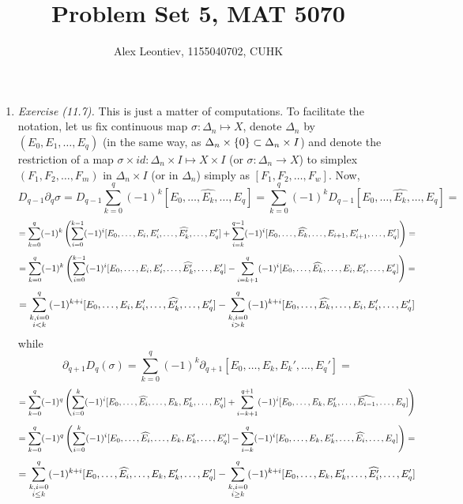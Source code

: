 \documentclass[8pt]{article} %
\title{Problem Set 5, MAT 5070}
\author{Alex Leontiev, 1155040702, CUHK}
\begin{document}
\maketitle
\begin{enumerate}[label=\bfseries \arabic*.]
	\item{{\it Exercise (11.7).} This is just a matter of computations. To facilitate the notation, let us fix continuous
		map $\sigma:\Delta_n\mapsto X$,
		denote $\Delta_n$ by $(E_0,E_1,\dots,E_q)$ (in the same way, as $\Delta_n\times\left\{0\right\}\subset\Delta_n\times I$) and denote
		the restriction of a map $\sigma\times id:\Delta_n\times I\mapsto X\times I$ (or $\sigma:\Delta_n\to X$) to simplex
		$(F_1,F_2,\dots,F_m)$ in $\Delta_n\times I$ (or in $\Delta_n$) simply as $[F_1,F_2,\dots,F_w]$. Now,
		\[D_{q-1}\partial_q\sigma=D_{q-1}\sum_{k=0}^q(-1)^k[E_0,\hdots,\widehat{E_k},\hdots,E_q]=\sum_{k=0}^q(-1)^kD_{q-1}
		[E_0,\hdots,\widehat{E_k},\hdots,E_q]=\]
		\[=\sum_{k=0}^q(-1)^k\mybra{\sum_{i=0}^{k-1}(-1)^i[E_0,\dots,E_i,E_i',\dots,\widehat{E_{k}'},\dots,E_q']+
		\sum_{i=k}^{q-1}(-1)^i [E_0,\dots,\widehat{E_{k}},\dots,E_{i+1},E_{i+1}',\dots,E_q']}=\]
		\[=\sum_{k=0}^q(-1)^k\mybra{\sum_{i=0}^{k-1}(-1)^i[E_0,\dots,E_i,E_i',\dots,\widehat{E_{k}'},\dots,E_q']-
		\sum_{i=k+1}^{q}(-1)^i [E_0,\dots,\widehat{E_{k}},\dots,E_{i},E_{i}',\dots,E_q']}=\]
		\[=\sum_{\begin{subarray}{c}k,i=0\\i< k\end{subarray}}^q(-1)^{k+i}[E_0,\dots,E_i,E_i',\dots,\widehat{E_{k}'},\dots,E_q']-
		\sum_{\begin{subarray}{c}k,i=0\\i>k\end{subarray}}^q(-1)^{k+i}[E_0,\dots,\widehat{E_{k}},\dots,E_{i},E_{i}',\dots,E_q']\]
		while \[\partial_{q+1}D_q(\sigma)=\sum_{k=0}^q(-1)^k\partial_{q+1}[E_0,\dots,E_k,E_k',\dots,E_q']=\]
		\[=\sum_{k=0}^q(-1)^q\mybra{\sum_{i=0}^k(-1)^i[E_0,\dots,\widehat{E_i},\dots,E_k,E_k',\dots,E_q']+\sum_{i=k+1}^{q+1}
		(-1)^i[E_0,\dots,E_k,E_k',\dots,\widehat{E_{i-1}},\dots,E_q]}\]
		\[=\sum_{k=0}^q(-1)^q\mybra{\sum_{i=0}^k(-1)^i[E_0,\dots,\widehat{E_i},\dots,E_k,E_k',\dots,E_q']-\sum_{i=k}^{q}
		(-1)^i[E_0,\dots,E_k,E_k',\dots,\widehat{E_{i}},\dots,E_q]}=\]
		\[=\sum_{\begin{subarray}{c}k,i=0\\i\leq k\end{subarray}}^q(-1)^{k+i}[E_0,\dots,\widehat{E_i},\dots,E_k,E_k',\dots,E_q']-
		\sum_{\begin{subarray}{c}k,i=0\\i\geq k\end{subarray}}^q(-1)^{k+i}[E_0,\dots,E_k,E_k',\dots,\widehat{E_{i}'},\dots,E_q']\]
}
\end{enumerate}
\end{document}
